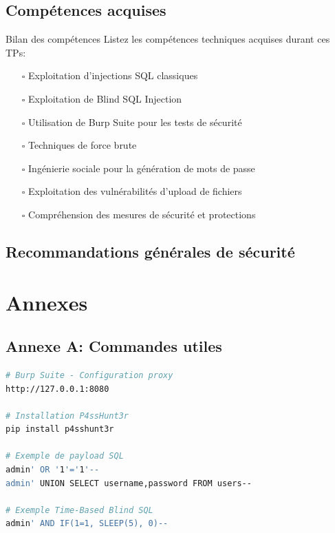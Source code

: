 \documentclass[12pt,a4paper]{article}
\begin{document}
\subsection{Compétences acquises}

\begin{exercicebox}{Bilan des compétences}
Listez les compétences techniques acquises durant ces TPs:
\begin{itemize}
    \item[$\square$] Exploitation d'injections SQL classiques
    \item[$\square$] Exploitation de Blind SQL Injection
    \item[$\square$] Utilisation de Burp Suite pour les tests de sécurité
    \item[$\square$] Techniques de force brute
    \item[$\square$] Ingénierie sociale pour la génération de mots de passe
    \item[$\square$] Exploitation des vulnérabilités d'upload de fichiers
    \item[$\square$] Compréhension des mesures de sécurité et protections
\end{itemize}
\end{exercicebox}

\subsection{Recommandations générales de sécurité}

\begin{answerbox}
\vspace{10cm}
\end{answerbox}

\newpage

\section*{Annexes}

\subsection*{Annexe A: Commandes utiles}

\begin{lstlisting}[language=bash]
# Burp Suite - Configuration proxy
http://127.0.0.1:8080

# Installation P4ssHunt3r
pip install p4sshunt3r

# Exemple de payload SQL
admin' OR '1'='1'--
admin' UNION SELECT username,password FROM users--

# Exemple Time-Based Blind SQL
admin' AND IF(1=1, SLEEP(5), 0)--
\end{lstlisting}
\end{document}
